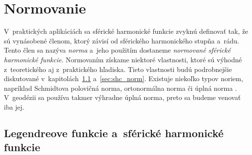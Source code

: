 \documentclass[a4paper, 12pt]{book}
\begin{document}
\section{Normovanie}
\label{sec:normalization}

V~praktických aplikáciách sa sférické harmonické funkcie zvyknú definovať tak, 
že sú vynásobené členom, ktorý závisí od sférického harmonického stupňa a~rádu.  
Tento člen sa nazýva \emph{norma} a~jeho použitím dostaneme \emph{normované 
sférické harmonické funkcie}.  Normovaním získame niektoré vlastnosti, ktoré sú 
výhodné z~teoretického aj z~praktického hľadiska.  Tieto vlastnosti budú 
podrobnejšie diskutované v~kapitolách~\ref{sec:leg_sh_norm} 
a~\ref{sec:shc_norm}.  Existuje niekoľko typov noriem, napríklad Schmidtova 
polovičná norma, ortonormálna norma či úplná norma \parencite{SHTOOLS}.  
V~geodézii sa používa takmer výhradne úplná norma, preto sa budeme venovať iba 
jej.

\subsection{Legendreove funkcie a~sférické harmonické funkcie}
\label{sec:leg_sh_norm}
\end{document}
